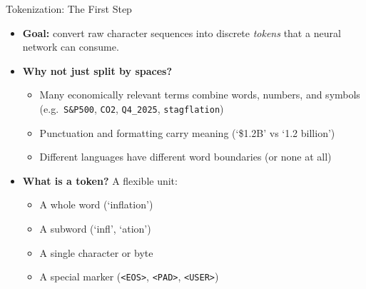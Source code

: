 \documentclass[10pt,english,aspectratio=169]{beamer}
\begin{document}
\begin{frame}{Tokenization: The First Step}
\begin{itemize}
\item \textbf{Goal:} convert raw character sequences into discrete \emph{tokens} that a neural network can consume.

\medskip
\item \textbf{Why not just split by spaces?}
\begin{itemize}
    \item Many economically relevant terms combine words, numbers, and symbols (e.g.\ \texttt{S\&P500}, \texttt{CO2}, \texttt{Q4\_2025}, \texttt{stagflation})
    \item Punctuation and formatting carry meaning (`\$1.2B' vs `1.2 billion')
    \item Different languages have different word boundaries (or none at all)
\end{itemize}

\medskip
\item \textbf{What is a token?} A flexible unit:
\begin{itemize}
    \item A whole word (`inflation')
    \item A subword (`infl', `ation')
    \item A single character or byte
    \item A special marker (\texttt{<EOS>}, \texttt{<PAD>}, \texttt{<USER>})
\end{itemize}
\end{itemize}
\end{frame}
\end{document}
